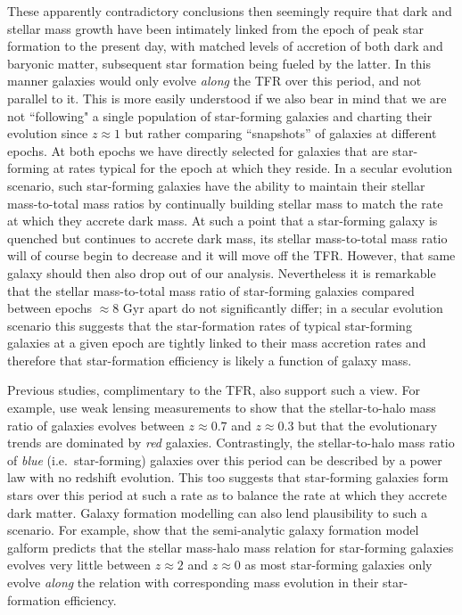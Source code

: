 \documentclass[a4paper,fleqn,usenatbib]{mnras}
\begin{document}
{These apparently contradictory conclusions then seemingly require that dark and stellar mass growth have been intimately linked from the epoch of peak star formation to the present day, with matched levels of accretion of both dark and baryonic matter, subsequent star formation being fueled by the latter. In this manner galaxies would only evolve {\it along} the TFR over this period, and not parallel to it. This is more easily understood if we also bear in mind that we are not ``following" a single population of star-forming galaxies and charting their evolution since $z\approx1$ but rather comparing ``snapshots'' of galaxies at different epochs. At both epochs we have directly selected for galaxies that are star-forming at rates typical for the epoch at which they reside. In a secular evolution scenario, such star-forming galaxies have the ability to maintain their stellar mass-to-total mass ratios by continually building stellar mass to match the rate at which they accrete dark mass. At such a point that a star-forming galaxy is quenched but continues to accrete dark mass, its stellar mass-to-total mass ratio will of course begin to decrease and it will move off the TFR. However, that same galaxy should then also drop out of our analysis. Nevertheless it is remarkable that the stellar mass-to-total mass ratio of star-forming galaxies compared between epochs $\approx$8 Gyr apart do not significantly differ; in a secular evolution scenario this suggests that the star-formation rates of typical star-forming galaxies at a given epoch are tightly linked to their mass accretion rates and therefore that star-formation efficiency is likely a function of galaxy mass. 

Previous studies, complimentary to the TFR, also support such a view. For example, \citet{Hudson:2015} use weak lensing measurements to show that the stellar-to-halo mass ratio of galaxies evolves between $z\approx0.7$ and $z\approx0.3$ but that the evolutionary trends are dominated by {\it red} galaxies. Contrastingly, the stellar-to-halo mass ratio of {\it blue} (i.e.\ star-forming) galaxies over this period can be described by a power law with no redshift evolution. This too suggests that star-forming galaxies form stars over this period at such a rate as to balance the rate at which they accrete dark matter. Galaxy formation modelling can also lend plausibility to such a scenario. For example, \citet{Mitchell:2016} show that the semi-analytic galaxy formation model {\sc galform} predicts that the stellar mass-halo mass relation for star-forming galaxies evolves very little between $z\approx2$ and $z\approx0$ as most star-forming galaxies only evolve {\it along} the relation with corresponding mass evolution in their star-formation efficiency. 

}
\end{document}
